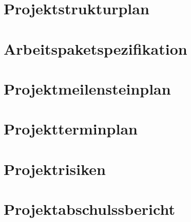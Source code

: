 \documentclass[10pt,a4paper,titlepage]{article}
\begin{document}
\section{Projektstrukturplan}
\newpage

\section{Arbeitspaketspezifikation}
\newpage

\section{Projektmeilensteinplan}
\newpage

\section{Projektterminplan}
\newpage

\section{Projektrisiken}
\newpage

\section{Projektabschulssbericht}
\newpage
\end{document}
